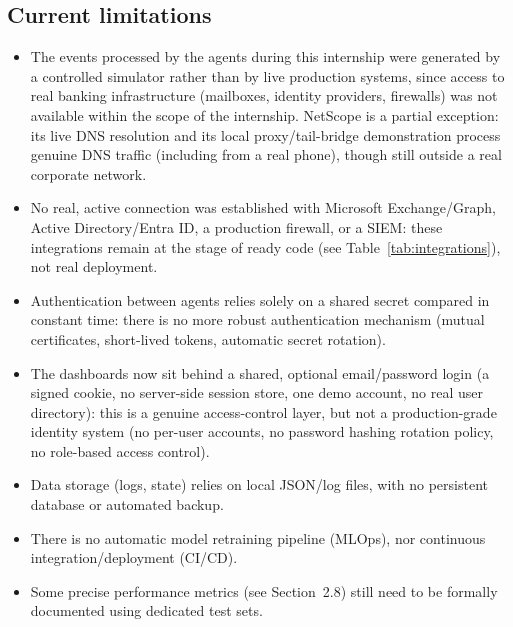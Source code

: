 \documentclass[12pt,a4paper]{report}
\begin{document}
\subsection*{Current limitations}
\begin{itemize}[nosep]
\item The events processed by the agents during this internship were generated by a controlled simulator rather than by live production systems, since access to real banking infrastructure (mailboxes, identity providers, firewalls) was not available within the scope of the internship. NetScope is a partial exception: its live DNS resolution and its local proxy/tail-bridge demonstration process genuine DNS traffic (including from a real phone), though still outside a real corporate network.
\item No real, active connection was established with Microsoft Exchange/Graph, Active Directory/Entra ID, a production firewall, or a SIEM: these integrations remain at the stage of ready code (see Table~\ref{tab:integrations}), not real deployment.
\item Authentication between agents relies solely on a shared secret compared in constant time: there is no more robust authentication mechanism (mutual certificates, short-lived tokens, automatic secret rotation).
\item The dashboards now sit behind a shared, optional email/password login (a signed cookie, no server-side session store, one demo account, no real user directory): this is a genuine access-control layer, but not a production-grade identity system (no per-user accounts, no password hashing rotation policy, no role-based access control).
\item Data storage (logs, state) relies on local JSON/log files, with no persistent database or automated backup.
\item There is no automatic model retraining pipeline (MLOps), nor continuous integration/deployment (CI/CD).
\item Some precise performance metrics (see Section~2.8) still need to be formally documented using dedicated test sets.
\end{itemize}
\end{document}
